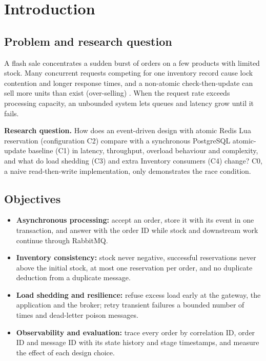 \documentclass[12pt,a4paper]{article}
\begin{document}
\section{Introduction}
\subsection{Problem and research question}
A flash sale concentrates a sudden burst of orders on a few products with
limited stock. Many concurrent requests competing for one inventory record
cause lock contention and longer response times, and a non-atomic
check-then-update can sell more units than exist (over-selling)
\cite{kleppmann}. When the
request rate exceeds processing capacity, an unbounded system lets queues and
latency grow until it fails.

\textbf{Research question.} How does an event-driven design with atomic Redis
Lua reservation (configuration C2) compare with a synchronous PostgreSQL
atomic-update baseline (C1) in latency, throughput, overload behaviour and
complexity, and what do load shedding (C3) and extra Inventory consumers (C4)
change? C0, a naive read-then-write implementation, only demonstrates the race
condition.

\subsection{Objectives}
\begin{itemize}
  \item \textbf{Asynchronous processing:} accept an order, store it with its
    event in one transaction, and answer with the order ID while stock and
    downstream work continue through RabbitMQ.
  \item \textbf{Inventory consistency:} stock never negative, successful
    reservations never above the initial stock, at most one reservation per
    order, and no duplicate deduction from a duplicate message.
  \item \textbf{Load shedding and resilience:} refuse excess load early at the
    gateway, the application and the broker; retry transient failures a
    bounded number of times and dead-letter poison messages.
  \item \textbf{Observability and evaluation:} trace every order by
    correlation ID, order ID and message ID with its state history and stage
    timestamps, and measure the effect of each design choice.
\end{itemize}
\end{document}
